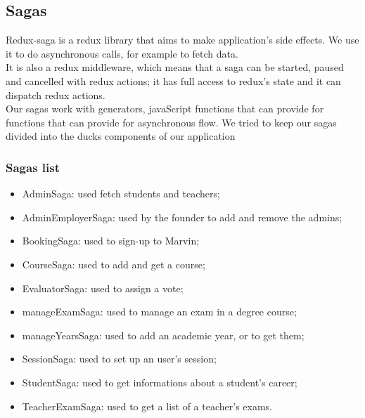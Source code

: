 \documentclass[../redux]{subfiles}
\begin{document}
	\subsection{Sagas}
	Redux-saga is a redux library that aims to make application's side effects. We use it to do asynchronous calls, for example to fetch data.\\
	It is also a redux middleware, which means that a saga can be started, paused and cancelled with redux actions; it has full access to redux's state and it can dispatch redux actions.\\
	Our sagas work with generators, javaScript functions that can provide for functions that can provide for asynchronous flow. We tried to keep our sagas divided into the ducks components of our application
	
	\subsubsection{Sagas list}
	\begin{itemize}
		\item AdminSaga: used fetch students and teachers;
		\item AdminEmployerSaga: used by the founder to add and remove the admins;
		\item BookingSaga: used to sign-up to Marvin;
		\item CourseSaga: used to add and get a course;
		\item EvaluatorSaga: used to assign a vote;
		\item manageExamSaga: used to manage an exam in a degree course;
		\item manageYearsSaga: used to add an academic year, or to get them;
		\item SessionSaga: used to set up an user's session;
		\item StudentSaga: used to get informations about a student's career;
		\item TeacherExamSaga: used to get a list of a teacher's exams.
	\end{itemize}
\end{document}

